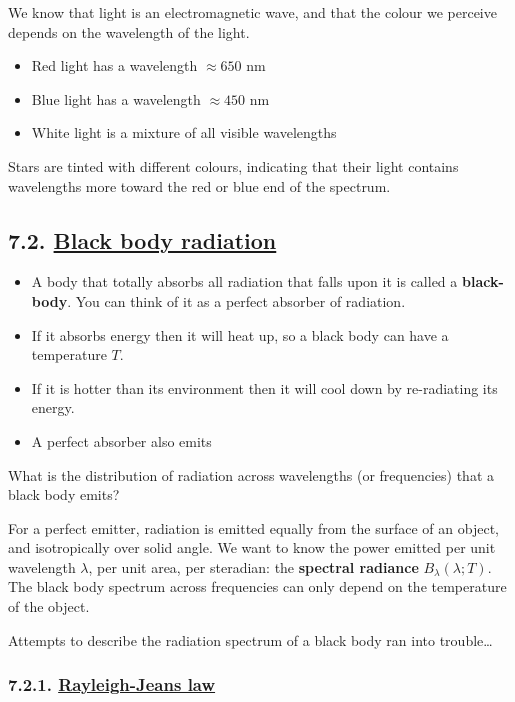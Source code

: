 \documentclass[
  letterpaper,
  DIV=11,
  numbers=noendperiod]{scrartcl}
\providecommand{\tightlist}{%
  \setlength{\itemsep}{0pt}\setlength{\parskip}{0pt}}\usepackage{longtable,booktabs,array}
\begin{document}
We know that light is an electromagnetic wave, and that the colour we
perceive depends on the wavelength of the light.

\begin{itemize}
\tightlist
\item
  Red light has a wavelength \(\approx 650\) nm
\item
  Blue light has a wavelength \(\approx 450\) nm
\item
  White light is a mixture of all visible wavelengths
\end{itemize}

Stars are tinted with different colours, indicating that their light
contains wavelengths more toward the red or blue end of the spectrum.

\hypertarget{black-body-radiation}{%
\subsection{\texorpdfstring{7.2. \protect\hyperlink{toc0_}{Black body
radiation}}{7.2. Black body radiation}}\label{black-body-radiation}}

\begin{itemize}
\tightlist
\item
  A body that totally absorbs all radiation that falls upon it is called
  a \textbf{black-body}. You can think of it as a perfect absorber of
  radiation.
\item
  If it absorbs energy then it will heat up, so a black body can have a
  temperature \(T\).
\item
  If it is hotter than its environment then it will cool down by
  re-radiating its energy.
\item
  A perfect absorber also emits
\end{itemize}

What is the distribution of radiation across wavelengths (or
frequencies) that a black body emits?

For a perfect emitter, radiation is emitted equally from the surface of
an object, and isotropically over solid angle. We want to know the power
emitted per unit wavelength \(\lambda\), per unit area, per steradian:
the \textbf{spectral radiance} \(B_\lambda(\lambda;T)\). The black body
spectrum across frequencies can only depend on the temperature of the
object.

Attempts to describe the radiation spectrum of a black body ran into
trouble\ldots{}

\hypertarget{rayleigh-jeans-law}{%
\subsubsection{\texorpdfstring{7.2.1.
\protect\hyperlink{toc0_}{Rayleigh-Jeans
law}}{7.2.1. Rayleigh-Jeans law}}\label{rayleigh-jeans-law}}
\end{document}
